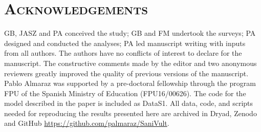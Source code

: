 \documentclass[12pt]{article}
\begin{document}
\section*{\textsc{Acknowledgements}}
GB, JASZ and PA conceived the study; GB and FM undertook the surveys; PA designed and conducted the analyses; PA led manuscript writing with inputs from all authors. The authors have no conflicts of interest to declare for the manuscript. The constructive comments made by the editor and two anonymous reviewers greatly improved the quality of previous versions of the manuscript. Pablo Almaraz was supported by a pre-doctoral fellowship through the program FPU of the Spanish Ministry of Education (FPU16/00626). The code for the model described in the paper is included as DataS1. All data, code, and scripts needed for reproducing the results presented here are archived in Dryad, Zenodo  and GitHub \url{https://github.com/palmaraz/SaniVult}.

%
\end{document}
